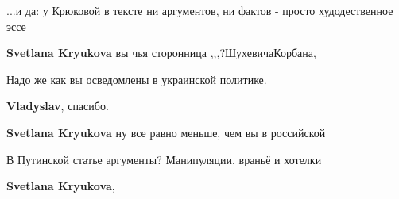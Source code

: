 \begin{itemize}
\begin{itemize}
 
...и да: у Крюковой в тексте ни аргументов, ни фактов - просто худодественное эссе

 
\textbf{Svetlana Kryukova} вы чья сторонница ,,,?ШухевичаКорбана,🤘🦧


 
Надо же как вы осведомлены в украинской политике.

 

\textbf{Vladyslav}, спасибо.

 
\textbf{Svetlana Kryukova} ну все равно меньше, чем вы в российской

 
В Путинской статье аргументы? Манипуляции, враньё и хотелки

 
\textbf{Svetlana Kryukova}, 


\end{itemize}
\end{itemize}
